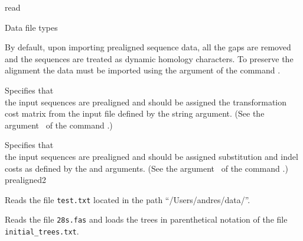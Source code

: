 \begin{command}{read}{}
\begin{arguments}
\begin{argumentgroup}{Data file types}
	\begin{statement}
            By default, upon importing prealigned sequence data, all the gaps are
             removed and the sequences are treated as dynamic homology characters.
             To preserve the alignment the data must be imported using the
              argument of the command .
          \end{statement}
        
            {Specifies that \\ the input sequences are prealigned and
            should be assigned the transformation cost matrix from the 
            input file defined by the string argument. (See the argument~ 
            of the command .)}
            {}
        
            {Specifies that\\ the input sequences are prealigned and should be
            assigned substitution and indel costs as defined by the
             and  arguments. (See the argument~ 
            of the command .)}
            {prealigned2}

	\end{argumentgroup}
		
	\end{arguments}


	\begin{poyexamples}
	
            {Reads the file \texttt{test.txt} located in the path
            ``/Users/andres/data/''.}

            {Reads the file \texttt{28s.fas} and loads the trees in parenthetical notation
            of the file \texttt{initial\_trees.txt}.}


\end{poyexamples}
\end{command}
